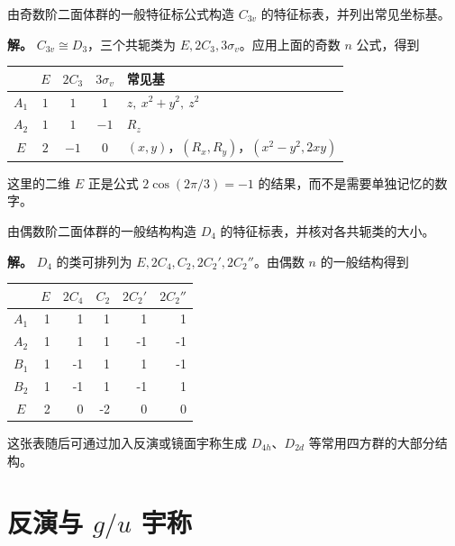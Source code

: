 \begin{example}[$C_{3v}$]
由奇数阶二面体群的一般特征标公式构造 $C_{3v}$ 的特征标表，并列出常见坐标基。

\textbf{解。} $C_{3v}\cong D_3$，三个共轭类为 $E,2C_3,3\sigma_v$。应用上面的奇数 $n$ 公式，得到
\begin{center}
\begin{tabular}{c|ccc|l}
\toprule
 & $E$ & $2C_3$ & $3\sigma_v$ & 常见基 \\
\midrule
$A_1$ & $1$ & $1$ & $1$ & $z,\ x^2+y^2,\ z^2$ \\
$A_2$ & $1$ & $1$ & $-1$ & $R_z$ \\
$E$   & $2$ & $-1$ & $0$ & $(x,y)$，$(R_x,R_y)$，$(x^2-y^2,2xy)$ \\
\bottomrule
\end{tabular}
\end{center}
这里的二维 $E$ 正是公式 $2\cos(2\pi/3)=-1$ 的结果，而不是需要单独记忆的数字。
\end{example}

\begin{example}[$D_4$]
由偶数阶二面体群的一般结构构造 $D_4$ 的特征标表，并核对各共轭类的大小。

\textbf{解。} $D_4$ 的类可排列为 $E,2C_4,C_2,2C_2',2C_2''$。由偶数 $n$ 的一般结构得到
\begin{center}
\begin{tabular}{c|rrrrr}
\toprule
 & $E$ & $2C_4$ & $C_2$ & $2C_2'$ & $2C_2''$ \\
\midrule
$A_1$ & 1& 1& 1& 1& 1\\
$A_2$ & 1& 1& 1&-1&-1\\
$B_1$ & 1&-1& 1& 1&-1\\
$B_2$ & 1&-1& 1&-1& 1\\
$E$   & 2& 0&-2& 0& 0\\
\bottomrule
\end{tabular}
\end{center}
这张表随后可通过加入反演或镜面宇称生成 $D_{4h}$、$D_{2d}$ 等常用四方群的大部分结构。
\end{example}

\section{\texorpdfstring{反演与 $g/u$ 宇称}{反演与 g/u 宇称}}

